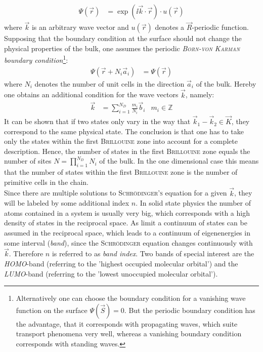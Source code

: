 \begin{align}
	\Psi(\vec{r}) &= \exp\left(\ii\vec{k}\cdot\vec{r}\right) \cdot u\left(\vec{r}\right)
\end{align}
where $\vec{k}$ is an arbitrary wave vector and $u\left(\vec{r}\right)$ denotes a $\vec{R}$-periodic function.\\
Supposing that the boundary condition at the surface should not change the physical properties of the bulk, one assumes the periodic \emph{\textsc{Born-von Karman} boundary condition}\footnote{Alternatively one can choose the boundary condition  for a vanishing wave function on the surface $\Psi\left(\vec{S}\right) = 0$. But the periodic boundary condition has the advantage, that it corresponds with propagating waves, which suite transport phenomena very well, whereas a vanishing boundary condition corresponds with standing waves.}:
\begin{align}
	\Psi\left(\vec{r} + N_i \vec{a}_i\right) &= \Psi\left(\vec{r}\right)
\end{align}
where $N_i$ denotes the number of unit cells in the direction $\vec{a}_i$ of the bulk. Hereby one obtains an additional condition for the wave vectors $\vec{k}$, namely:
\begin{align}
	\vec{k} &= \sum_{i = 1}^{N_D} \frac{m_i}{N_i} \vec{b}_i & m_i \in \mathbb{Z} 
\end{align}
It can be shown that if two states only vary in the way that $\vec{k}_1 - \vec{k}_2 \in \vec{K}$, they correspond to the same physical state. The conclusion is that one has to take only the states within the first \textsc{Brillouine} zone into account for a complete description. Hence, the number of states in the first \textsc{Brillouine} zone equals the number of sites $N = \prod_{i = 1}^{N_D}N_i$ of the bulk. In the one dimensional case this means that the number of states within the first \textsc{Brillouine} zone is the number of primitive cells in the chain.\\
Since there are multiple solutions to \textsc{Schrödinger's} equation for a given $\vec{k}$, they will be labeled by some additional index $n$. In solid state physics the number of atoms contained in a system is usually very big, which corresponds with a high density of states in the reciprocal space. As limit a continuum of states can be assumed in the reciprocal space, which leads to a continuum of eigenenergies in some interval (\emph{band}), since the \textsc{Schrödinger} equation changes continuously with $\vec{k}$. Therefore $n$ is referred to as \emph{band index}. Two bands of special interest are the \emph{HOMO}-band (referring to the 'highest occupied molecular orbital') and the \emph{LUMO}-band (referring to the 'lowest unoccupied molecular orbital').

